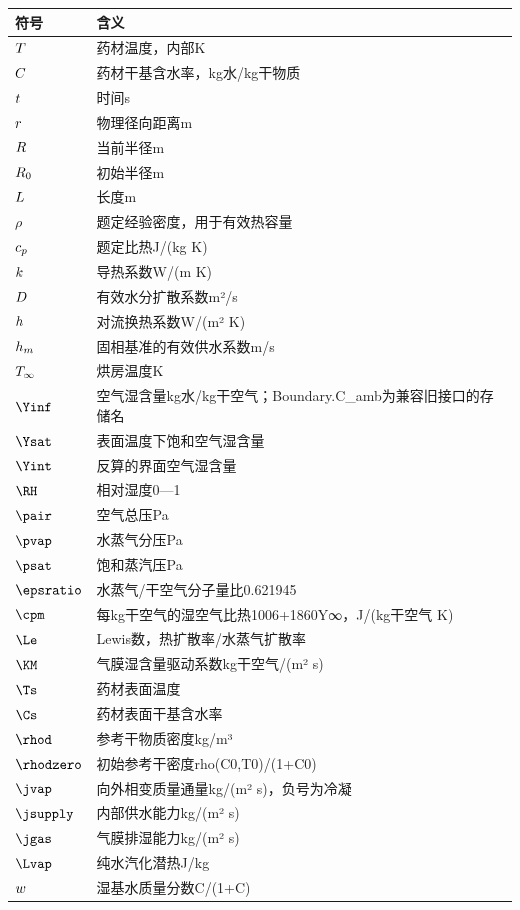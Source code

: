 \begin{longtable}{lp{10cm}}
\toprule 符号 & 含义 \\ \midrule
$T$ & 药材温度，内部K \\
$C$ & 药材干基含水率，kg水/kg干物质 \\
$t$ & 时间s \\
$r$ & 物理径向距离m \\
$R$ & 当前半径m \\
$R_0$ & 初始半径m \\
$L$ & 长度m \\
$\rho$ & 题定经验密度，用于有效热容量 \\
$c_p$ & 题定比热J/(kg K) \\
$k$ & 导热系数W/(m K) \\
$D$ & 有效水分扩散系数m²/s \\
$h$ & 对流换热系数W/(m² K) \\
$h_m$ & 固相基准的有效供水系数m/s \\
$T_\infty$ & 烘房温度K \\
$\Yinf$ & 空气湿含量kg水/kg干空气；Boundary.C\_amb为兼容旧接口的存储名 \\
$\Ysat$ & 表面温度下饱和空气湿含量 \\
$\Yint$ & 反算的界面空气湿含量 \\
$\RH$ & 相对湿度0—1 \\
$\pair$ & 空气总压Pa \\
$\pvap$ & 水蒸气分压Pa \\
$\psat$ & 饱和蒸汽压Pa \\
$\epsratio$ & 水蒸气/干空气分子量比0.621945 \\
$\cpm$ & 每kg干空气的湿空气比热1006+1860Y∞，J/(kg干空气 K) \\
$\Le$ & Lewis数，热扩散率/水蒸气扩散率 \\
$\KM$ & 气膜湿含量驱动系数kg干空气/(m² s) \\
$\Ts$ & 药材表面温度 \\
$\Cs$ & 药材表面干基含水率 \\
$\rhod$ & 参考干物质密度kg/m³ \\
$\rhodzero$ & 初始参考干密度rho(C0,T0)/(1+C0) \\
$\jvap$ & 向外相变质量通量kg/(m² s)，负号为冷凝 \\
$\jsupply$ & 内部供水能力kg/(m² s) \\
$\jgas$ & 气膜排湿能力kg/(m² s) \\
$\Lvap$ & 纯水汽化潜热J/kg \\
$w$ & 湿基水质量分数C/(1+C) \\

\end{longtable}
